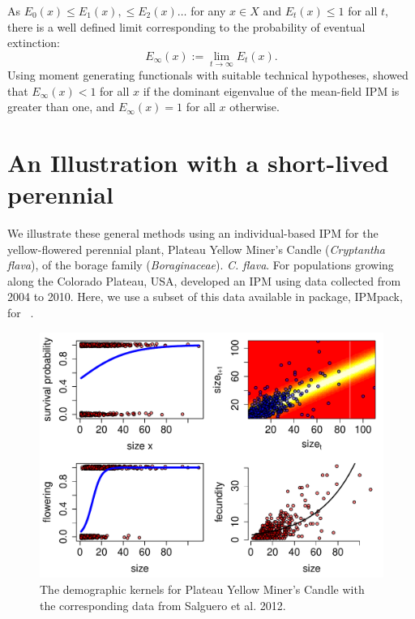 \documentclass[12pt]{amsart}\usepackage[]{graphicx}\usepackage[]{color}
\makeatletter
\def\maxwidth{ %
  \ifdim\Gin@nat@width>\linewidth
    \linewidth
  \else
    \Gin@nat@width
  \fi
}
\newenvironment{knitrout}{}{} %
\makeatother
\begin{document}
As $E_0(x)\le E_1(x),\le E_2(x)\dots$ for any $x\in X$ and $E_t(x)\le 1$ for all $t$, there is a well defined limit corresponding to the probability of eventual extinction:
\[
E_\infty(x):=\lim_{t\to\infty} E_t(x).
\]
Using moment generating functionals with suitable technical hypotheses, \citet{harris-63} showed that $E_\infty(x)<1$ for all $x$ if the dominant eigenvalue of the mean-field IPM is greater than one, and $E_\infty(x)=1$ for all $x$ otherwise.

\section*{An Illustration with a short-lived perennial}

We illustrate these general methods using an individual-based IPM for the yellow-flowered perennial plant, Plateau Yellow Miner's Candle (\emph{Cryptantha flava}), of the borage family (\emph{Boraginaceae}). \emph{C. flava}. For populations growing along the Colorado Plateau, USA, \citet{salguero-etal-12} developed an IPM using data collected from 2004 to 2010. Here, we use a subset of this data available in package, IPMpack, for ~\citep{IPMpack}.

\begin{knitrout}
\color{fgcolor}\begin{figure}
\includegraphics[width=\maxwidth]{figure/components-1} \caption[The demographic kernels for Plateau Yellow Miner's Candle with the corresponding data from Salguero et al]{The demographic kernels for Plateau Yellow Miner's Candle with the corresponding data from Salguero et al. 2012.}\label{fig:components}
\end{figure}


\end{knitrout}
\end{document}
